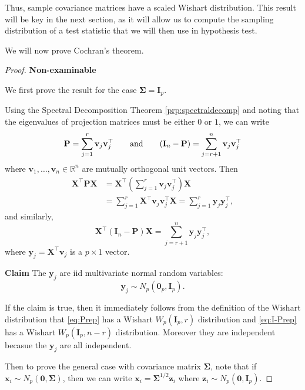 \documentclass[
]{book}
\theoremstyle{definition}
\theoremstyle{definition}
\theoremstyle{definition}
\theoremstyle{definition}
\theoremstyle{remark}
\begin{document}
Thus, sample covariance matrices have a scaled Wishart distribution.
This result will be key in the next section, as it will allow us to compute the sampling distribution of a test statistic that we will then use in hypothesis test.

We will now prove Cochran's theorem.

\begin{proof}
\textbf{Non-examinable}

We first prove the result for the case \(\boldsymbol{\Sigma}= {\mathbf I}_p\).

Using the Spectral Decomposition Theorem \ref{prp:spectraldecomp} and noting that the eigenvalues of projection matrices must be either \(0\) or \(1\), we can write
\[
{\mathbf P}=\sum_{j=1}^r \mathbf v_j \mathbf v_j^\top \qquad  \hbox{and} \qquad 
(\mathbf I_n-{\mathbf P})=\sum_{j=r+1}^n \mathbf v_j \mathbf v_j^\top
\]
where \(\mathbf v_1, \ldots , \mathbf v_n \in \mathbb{R}^n\) are mutually orthogonal unit vectors. Then
\begin{align}
\mathbf X^\top \mathbf P\mathbf X&=  \mathbf X^\top \left (\sum_{j=1}^r \mathbf v_j \mathbf v_j^\top \right) \mathbf X\nonumber \\
& =\sum_{j=1}^r \mathbf X^\top \mathbf v_j \mathbf v_j^\top \mathbf X=\sum_{j=1}^r \mathbf y_j \mathbf y_j^\top,
\label{eq:Prep}
\end{align}
and similarly,
\begin{equation}
\mathbf X^\top (\mathbf I_n -\mathbf P) \mathbf X=\sum_{j=r+1}^n \mathbf y_j \mathbf y_j^\top,
\label{eq:I-Prep}
\end{equation}
where \(\mathbf y_j=\mathbf X^\top \mathbf v_j\) is a \(p \times 1\) vector.

\textbf{Claim}
The \(\mathbf y_j\) are iid multivariate normal random variables:
\[\mathbf y_j \sim N_p({\mathbf 0}_p, \mathbf I_p).\]

If the claim is true, then it immediately follows from the
definition of the Wishart distribution that \eqref{eq:Prep} has a Wishart \(W_p(\mathbf I_p,r)\) distribution and \eqref{eq:I-Prep} has a Wishart \(W_p(\mathbf I_p, n-r)\) distribution. Moreover they are independent becasue the \(\mathbf y_j\) are all independent.

Then to prove the general case with covariance matrix \(\boldsymbol{\Sigma}\), note that if \(\mathbf x_i\sim N_p({\boldsymbol 0}, \boldsymbol{\Sigma})\), then we can write
\(\mathbf x_i=\boldsymbol{\Sigma}^{1/2}\mathbf z_i\) where
\(\mathbf z_i \sim N_p({\boldsymbol 0}, \mathbf I_p)\).


\end{proof}
\end{document}
